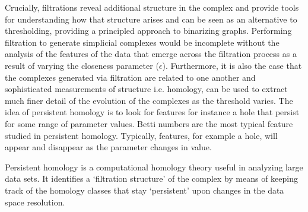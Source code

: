 \documentclass[onecollarge,runningheads]{svjour2}
\begin{document}
Crucially, filtrations reveal additional structure in the complex and provide tools for understanding how that structure arises and can be seen as an alternative to thresholding, providing a principled approach to binarizing graphs. Performing filtration to generate simplicial complexes would be incomplete without the analysis of the features of the data that emerge across the filtration process as a result of varying the closeness parameter ($\epsilon$). Furthermore, it is also the case that the complexes generated via filtration are related to one another and sophisticated measurements of structure i.e. homology, can be used to extract much finer detail of the evolution of the complexes as the threshold varies.
The idea of persistent homology is to look for features for instance a hole that persist for some range of parameter values. Betti numbers are the most typical feature studied in persistent homology. Typically, features, for example a hole, will appear and disappear as the parameter changes in value. 


\begin{definition}
Persistent homology is a computational homology theory useful in analyzing large data sets. 
It identifies a ‘filtration structure’ of the complex by means of keeping track of the homology classes that stay ‘persistent’ upon changes in the data space resolution.
\end{definition}


\end{document}
